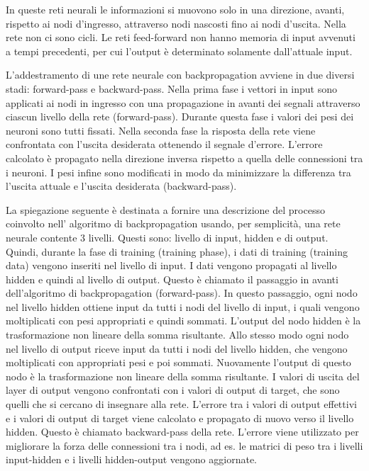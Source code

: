 In queste reti neurali le informazioni si muovono solo in una direzione, avanti, rispetto ai nodi d'ingresso, attraverso nodi nascosti fino ai nodi d'uscita. Nella rete non ci sono cicli. Le reti feed-forward non hanno memoria di input avvenuti a tempi precedenti, per cui l'output è determinato solamente dall'attuale input.

L'addestramento di une rete neurale con backpropagation avviene in due diversi stadi: forward-pass e backward-pass. Nella prima fase i vettori in input sono applicati ai nodi in ingresso con una propagazione in avanti dei segnali attraverso ciascun livello della rete (forward-pass). Durante questa fase i valori dei pesi dei neuroni sono tutti fissati. Nella seconda fase la risposta della rete viene confrontata con l'uscita desiderata ottenendo il segnale d'errore. L'errore calcolato è propagato nella direzione inversa rispetto a quella delle connessioni tra i neuroni. I pesi infine sono modificati in modo da minimizzare la differenza tra l'uscita attuale e l'uscita desiderata (backward-pass).

La spiegazione seguente è destinata a fornire una descrizione del processo coinvolto nell' algoritmo di backpropagation usando, per semplicità, una rete neurale contente 3 livelli. Questi sono: livello di input, hidden e di output.
Quindi, durante la fase di training (training phase), i dati di training (training data) vengono inseriti nel livello di input. I dati vengono propagati al livello hidden e quindi al livello di output. Questo è chiamato il passaggio in avanti dell'algoritmo di backpropagation (forward-pass). 
In questo passaggio, ogni nodo nel livello hidden ottiene input da tutti i nodi del livello di input, i quali vengono moltiplicati con pesi appropriati e quindi sommati. L'output del nodo hidden è la trasformazione non lineare della somma risultante. 
Allo stesso modo ogni nodo nel livello di output riceve input da tutti i nodi del livello hidden, che vengono moltiplicati con appropriati pesi e poi sommati. Nuovamente l'output di questo nodo è la trasformazione non lineare della somma risultante.
I valori di uscita del layer di output vengono confrontati con i valori di output di target, che sono quelli che si cercano di insegnare alla rete. L'errore tra i valori di output effettivi e i valori di output di target viene calcolato e propagato di nuovo verso il livello hidden. 
Questo è chiamato backward-pass della rete. L'errore viene utilizzato per migliorare la forza delle connessioni tra i nodi, ad es. le matrici di peso tra i livelli input-hidden e i livelli hidden-output vengono aggiornate.

